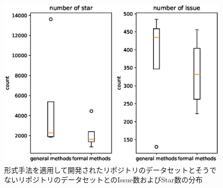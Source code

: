 \documentclass[main]{subfiles}
\begin{document}
\begin{figure}[p]
	\centering
	\includegraphics[width=\hsize]{figures/boxplot.eps}
	\caption{形式手法を適用して開発されたリポジトリのデータセットとそうでないリポジトリのデータセットとのIssue数およびStar数の分布}
	\label{fig:boxplot}
\end{figure}
\end{document}
